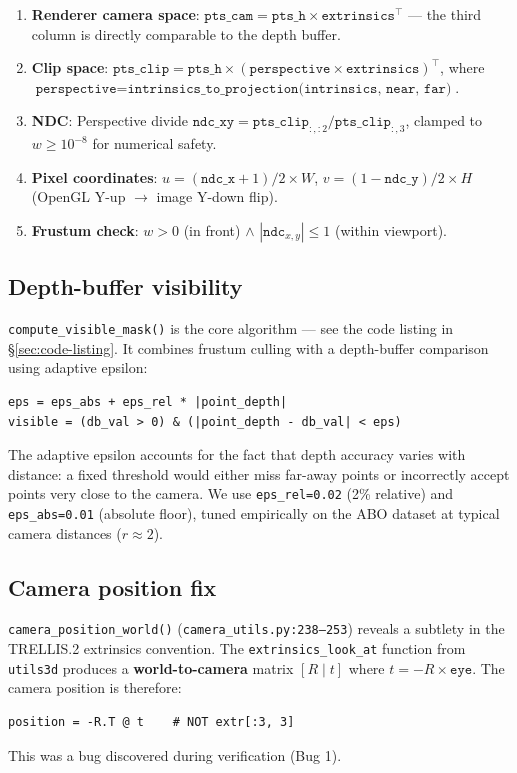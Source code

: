 \begin{enumerate}
  \item \textbf{Renderer camera space}: $\texttt{pts\_cam} = \texttt{pts\_h} \times \texttt{extrinsics}^\top$ --- the third column is directly comparable to the depth buffer.
  \item \textbf{Clip space}: $\texttt{pts\_clip} = \texttt{pts\_h} \times (\texttt{perspective} \times \texttt{extrinsics})^\top$, where $\texttt{perspective} = \texttt{intrinsics\_to\_projection(intrinsics, near, far)}$.
  \item \textbf{NDC}: Perspective divide $\texttt{ndc\_xy} = \texttt{pts\_clip}_{:,:2} / \texttt{pts\_clip}_{:,3}$, clamped to $w \ge 10^{-8}$ for numerical safety.
  \item \textbf{Pixel coordinates}: $u = (\texttt{ndc\_x} + 1) / 2 \times W$,
        $v = (1 - \texttt{ndc\_y}) / 2 \times H$ (OpenGL Y-up $\to$ image Y-down flip).
  \item \textbf{Frustum check}: $w > 0$ (in front) $\land$ $|\texttt{ndc}_{x,y}| \le 1$ (within viewport).
\end{enumerate}

\subsection{Depth-buffer visibility}

\texttt{compute\_visible\_mask()} is the core algorithm --- see the code
listing in \S\ref{sec:code-listing}. It combines frustum culling with a
depth-buffer comparison using adaptive epsilon:
\begin{lstlisting}
eps = eps_abs + eps_rel * |point_depth|
visible = (db_val > 0) & (|point_depth - db_val| < eps)
\end{lstlisting}
The adaptive epsilon accounts for the fact that depth accuracy varies with
distance: a fixed threshold would either miss far-away points or
incorrectly accept points very close to the camera. We use
\texttt{eps\_rel=0.02} (2\% relative) and \texttt{eps\_abs=0.01} (absolute
floor), tuned empirically on the ABO dataset at typical camera distances
($r \approx 2$).

\subsection{Camera position fix}

\texttt{camera\_position\_world()} (\texttt{camera\_utils.py:238--253})
reveals a subtlety in the TRELLIS.2 extrinsics convention. The
\texttt{extrinsics\_look\_at} function from \texttt{utils3d} produces a
\textbf{world-to-camera} matrix $[R \mid t]$ where $t = -R \times
\texttt{eye}$. The camera position is therefore:
\begin{lstlisting}
position = -R.T @ t    # NOT extr[:3, 3]
\end{lstlisting}
This was a bug discovered during verification (Bug 1).

